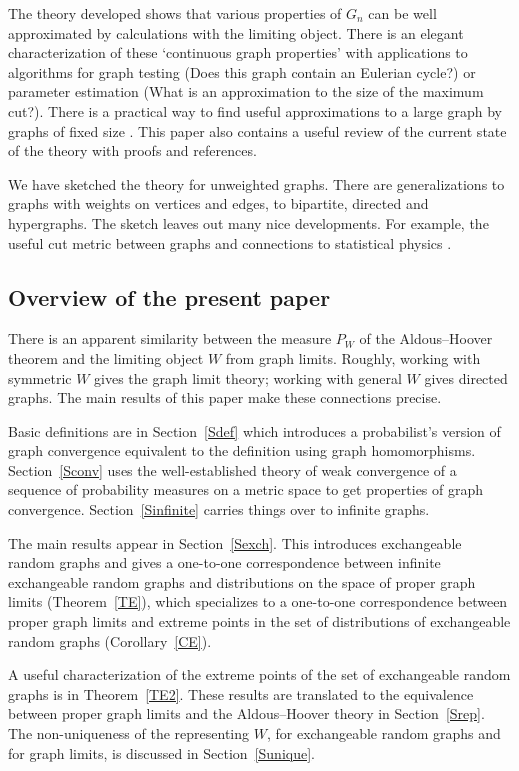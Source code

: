 \documentclass[11pt,reqno,tbtags]{amsart}
\numberwithin{equation}{section}
\theoremstyle{definition}
\theoremstyle{remark}
\newcommand{\refT}[1]{Theorem~\ref{#1}}
\newcommand{\refC}[1]{Corollary~\ref{#1}}
\newcommand{\refS}[1]{Section~\ref{#1}}
\renewcommand{\=}{:=}
\newcommand{\exch}{exchangeable}
\begin{document}
The theory developed shows that various properties of $G_n$ can be
well approximated by calculations with the limiting object. There is an
elegant characterization of these `continuous graph properties' with
applications to algorithms for graph testing (Does this graph
contain an Eulerian cycle?) or parameter estimation (What is an
approximation to the size of the maximum cut?). There is a practical
way to find useful approximations to a large graph by graphs of fixed
size \cite{BCL3}. 
This paper also contains a useful review of the current state of the
theory with 
proofs and references.

We have sketched the theory for unweighted graphs. There are
generalizations to graphs with weights on vertices and edges, to
bipartite, directed and hypergraphs. The sketch leaves out many nice
developments. For example, the useful cut metric between graphs \cite{LSz}
and connections to statistical physics \cite{BCL1ii}.

\subsection{Overview of the present paper}\label{secC}

There is an apparent similarity between the measure $P_W$ of the
Aldous--Hoover theorem and the limiting object $W$ from graph
limits. Roughly, working with symmetric $W$ gives the graph limit
theory; working with general $W$ gives directed graphs. The main
results of this paper make these connections precise.

Basic definitions are in \refS{Sdef} which introduces a probabilist's
version of graph convergence equivalent to the definition using graph
homomorphisms. \refS{Sconv} uses the well-established theory of weak
convergence of a sequence of probability measures on a metric space to
get properties of graph convergence. \refS{Sinfinite} carries things
over to infinite graphs.

The main results appear in \refS{Sexch}. This introduces exchangeable
random graphs and gives a one-to-one correspondence between infinite
exchangeable random graphs and distributions on the space of proper
graph limits (\refT{TE}), which specializes to a one-to-one 
correspondence between proper graph limits and extreme points in the
set of distributions of \exch{} random graphs (\refC{CE}).

A useful characterization of the extreme points of the
set of exchangeable random graphs is in \refT{TE2}. These results are
translated to the equivalence between proper graph limits and the
Aldous--Hoover theory in \refS{Srep}.
The non-uniqueness of the representing $W$, 
for \exch{} random graphs and for graph limits, 
is discussed in \refS{Sunique}.
\end{document}
